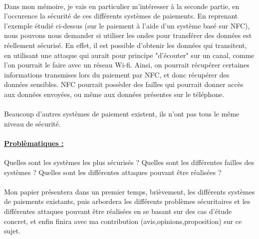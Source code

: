 \documentclass{article}
\begin{document}
\paragraph{}
Dans mon mémoire, je vais en particulier m’intéresser à la seconde partie, en l'occurence la sécurité de ces différents systèmes de paiements. En reprenant l’exemple étudié ci-dessus (sur le paiement à l’aide d’un système basé sur NFC), nous pouvons nous demander si utiliser les ondes pour transférer des données est réellement sécurisé. En effet, il est possible d'obtenir les données qui transitent, en utilisant une attaque qui aurait pour principe "d’écouter" sur un canal, comme l’on pourrait le faire avec un réseau Wi-fi. Ainsi, on pourrait récupérer certaines informations transmises lors du paiement par NFC, et donc récupérer des données sensibles. NFC pourrait possèder des failles qui pourrait donner accès aux données envoyées, ou même aux données présentes sur le téléphone.

\paragraph{}
Beaucoup d’autres systèmes de paiement existent, ils n'ont pas tous le même niveau de sécurité.
\paragraph{\underline{Problèmatiques :}}
Quelles sont les systèmes les plus sécurisés ? Quelles sont les différentes failles des systèmes ?  Quelles sont les différentes attaques pouvant être réalisées ?

\paragraph{}
Mon papier présentera dans un premier temps, brièvement, les différents systèmes de paiements existants, puis arbordera les différents problèmes sécuritaires et les différentes attaques pouvant être réalisées en se basant sur des cas d'étude concret, et enfin finira avec ma contribution (avis,opinions,proposition) sur ce sujet.


\newpage
\end{document}
